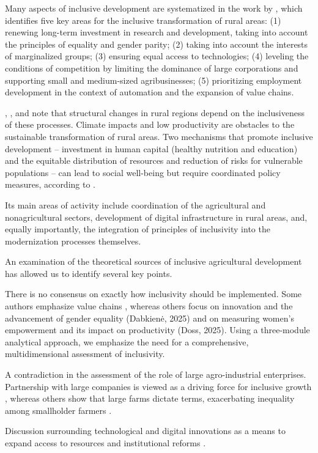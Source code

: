 ﻿\documentclass[pdflatex,sn-mathphys-ay]{sn-jnl}
\begin{document}
Many aspects of inclusive development are systematized in the work
by \citet{ref55}, which identifies five key areas for the
inclusive transformation of rural areas: (1) renewing long-term
investment in research and development, taking into account the
principles of equality and gender parity; (2) taking into account the
interests of marginalized groups; (3) ensuring equal access to
technologies; (4) leveling the conditions of competition by limiting the
dominance of large corporations and supporting small and medium-sized
agribusinesses; (5) prioritizing employment development in the context
of automation and the expansion of value chains.

\citet{ref47}, \citet{ref64}, and \citet{ref96} note that structural changes in rural
regions depend on the inclusiveness of these processes. Climate impacts
and low productivity are obstacles to the sustainable transformation of
rural areas. Two mechanisms that promote inclusive development --
investment in human capital (healthy nutrition and education) and the
equitable distribution of resources and reduction of risks for
vulnerable populations -- can lead to social well-being but require
coordinated policy measures, according to \citet{ref21}.

Its main areas of activity include coordination of the agricultural and
nonagricultural sectors, development of digital infrastructure in rural
areas, and, equally importantly, the integration of principles of
inclusivity into the modernization processes themselves.

An examination of the theoretical sources of inclusive agricultural
development has allowed us to identify several key points.

There is no consensus on exactly how inclusivity should be implemented.
Some authors emphasize value chains \citep{ref81}, whereas
others focus on innovation and the advancement of gender equality
(Dabkienė, 2025) and on measuring women's empowerment and its impact on
productivity (Doss, 2025). Using a three-module analytical approach, we
emphasize the need for a comprehensive, multidimensional assessment of
inclusivity.

A contradiction in the assessment of the role of large agro-industrial
enterprises. Partnership with large
companies is viewed as a driving force for inclusive growth
\citep{ref34}, whereas others show that large farms dictate terms,
exacerbating inequality among smallholder farmers \citep{ref90}.

Discussion surrounding technological and digital innovations as a means
to expand access to resources \citep{ref105,ref43,ref37} and
institutional reforms \citep{ref28}.
\end{document}
